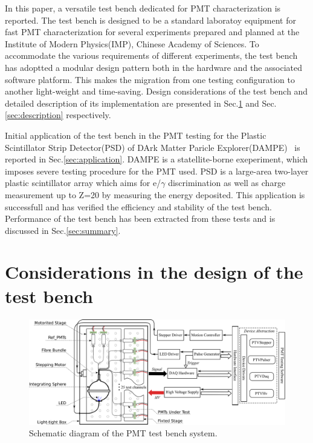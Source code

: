 \documentclass[review,number,sort&compress]{elsarticle}
\begin{document}
In this paper, a versatile test bench dedicated for PMT characterization is reported.
The test bench is designed to be a standard laboratoy equipment for fast PMT characterization for several experiments prepared and planned at the Institute of Modern Physics(IMP), Chinese Academy of Sciences.
To accommodate the various requirements of different experiments, the test bench has adoptted a modular design pattern both in the hardware and the associated software platform.
This makes the migration from one testing configuration to another light-weight and time-saving.
Design considerations of the test bench and detailed description of its implementation are presented in Sec.\ref{sec:design_consideration} and Sec.\ref{sec:description} respectively.

Initial application of the test bench in the PMT testing for the Plastic Scintillator Strip Detector(PSD) of DArk Matter Paricle Explorer(DAMPE)~\cite{Chang_Jin_dampe} is reported in Sec.\ref{sec:application}.
DAMPE is a statellite-borne  exeperiment, which imposes severe testing procedure for the PMT used.
PSD is a large-area two-layer plastic scintillator array which aims for  e/$\gamma$ discrimination as well as charge measurement up to Z=20 by measuring the energy deposited.
This application is successfull and has verified the efficiency and stability of the test bench.
Performance of the test bench has been extracted from these tests and is discussed in Sec.\ref{sec:summary}.

\section{Considerations in the design of the test bench}
\label{sec:design_consideration}
\begin{figure}
 \centering
 \includegraphics[width=160mm]{testbench_overview}
\caption{Schematic diagram of the PMT test bench system.}
\label{fig:testbench_overveiw}
\end{figure}
\end{document}
